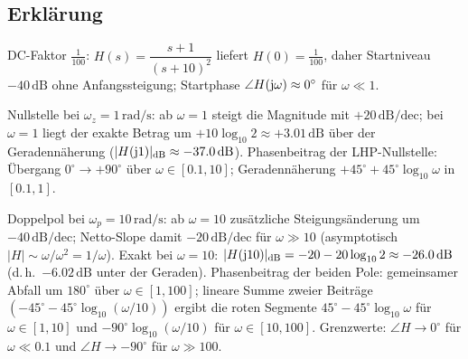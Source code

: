 \begin{center}
\end{center}
\newpage
\subsection{Erklärung}
\vspace{5mm}
\begin{description}[leftmargin=1.2em,labelsep=.6em,font=\bfseries]
\item[Schritt 1] DC-Faktor $\frac{1}{100}$: $H(s)=\dfrac{s+1}{(s+10)^2}$ liefert $H(0)=\tfrac{1}{100}$, daher Startniveau $-40\,\mathrm{dB}$ ohne Anfangssteigung; Startphase $\angle H(\operatorname{j}\!\omega)\approx0^\circ$ für $\omega\ll1$.
\item[Schritt 2] Nullstelle bei $\omega_z=1\,\mathrm{rad/s}$: ab $\omega=1$ steigt die Magnitude mit $+20\,\mathrm{dB/dec}$; bei $\omega=1$ liegt der exakte Betrag um $+10\log_{10}2\approx+3.01\,\mathrm{dB}$ über der Geradennäherung ($|H(\operatorname{j}\!1)|_{\mathrm{dB}}\approx-37.0\,\mathrm{dB}$). Phasenbeitrag der LHP-Nullstelle: Übergang $0^\circ\to+90^\circ$ über $\omega\in[0.1,10]$; Geradennäherung $+45^\circ+45^\circ\log_{10}\omega$ in $[0.1,1]$.
\item[Schritt 3] Doppelpol bei $\omega_p=10\,\mathrm{rad/s}$: ab $\omega=10$ zusätzliche Steigungsänderung um $-40\,\mathrm{dB/dec}$; Netto-Slope damit $-20\,\mathrm{dB/dec}$ für $\omega\gg10$ (asymptotisch $|H|\sim \omega/\omega^2=1/\omega$). Exakt bei $\omega=10$: $|H(\operatorname{j}\!10)|_{\mathrm{dB}}=-20-20\log_{10}2\approx-26.0\,\mathrm{dB}$ (d.\,h.\ $-6.02\,\mathrm{dB}$ unter der Geraden). Phasenbeitrag der beiden Pole: gemeinsamer Abfall um $180^\circ$ über $\omega\in[1,100]$; lineare Summe zweier Beiträge $(-45^\circ-45^\circ\log_{10}(\omega/10))$ ergibt die roten Segmente $45^\circ-45^\circ\log_{10}\omega$ für $\omega\in[1,10]$ und $-90^\circ\log_{10}(\omega/10)$ für $\omega\in[10,100]$. Grenzwerte: $\angle H\to0^\circ$ für $\omega\ll0.1$ und $\angle H\to-90^\circ$ für $\omega\gg100$.
\end{description}

